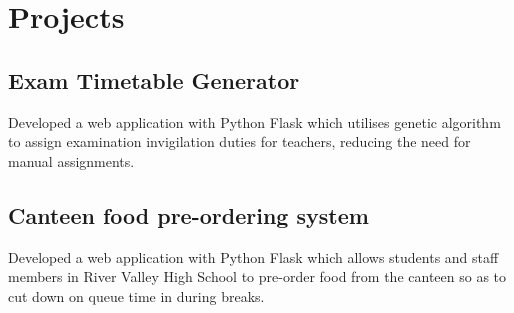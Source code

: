 \documentclass[a4paper,hidelinks]{resume} %
\begin{document}
\begin{minipage}[t]{0.44\textwidth}
    
    \sectionspace %
    
    
    \section{Projects}
    
    \sectionspace %
    
    
    \subsection{Exam Timetable Generator}
    
    Developed a web application with Python Flask which utilises genetic algorithm to assign examination invigilation duties for teachers, reducing the need for manual assignments.
    
    \sectionspace %
    
    \subsection{Canteen food pre-ordering system}

    Developed a web application with Python Flask which allows students and staff members in River Valley High School to pre-order food from the canteen so as to cut down on queue time in during breaks.
    
    \sectionspace %


\end{minipage} %
\hfill
%
%
\end{document}
